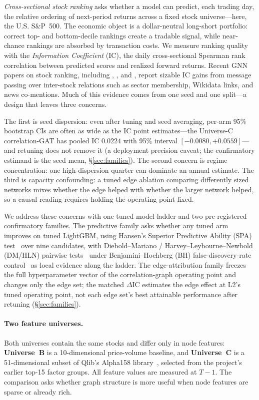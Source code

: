 \documentclass{article}
\begin{document}
\emph{Cross-sectional stock ranking} asks whether a model can predict, each trading day, the relative ordering of next-period returns across a fixed stock universe---here, the U.S. S\&P~500. The economic object is a dollar-neutral long-short portfolio: correct top- and bottom-decile rankings create a tradable signal, while near-chance rankings are absorbed by transaction costs. We measure ranking quality with the \emph{Information Coefficient} (IC), the daily cross-sectional Spearman rank correlation between predicted scores and realized forward returns. Recent GNN papers on stock ranking, including \citet{feng2019temporal}, \citet{kim2019hats}, and \citet{sawhney2021sthansr}, report sizable IC gains from message passing over inter-stock relations such as sector membership, Wikidata links, and news co-mentions. Much of this evidence comes from one seed and one split---a design that leaves three concerns.

The first is seed dispersion: even after tuning and seed averaging, per-arm 95\% bootstrap CIs are often as wide as the IC point estimates---the Universe-C correlation-GAT has pooled IC $0.0224$ with 95\% interval $[-0.0080,+0.0559]$---and retuning does not remove it (a deployment precision caveat; the confirmatory estimand is the seed mean, \S\ref{sec:families}). The second concern is regime concentration: one high-dispersion quarter can dominate an annual estimate. The third is capacity confounding: a tuned edge ablation comparing differently sized networks mixes whether the edge helped with whether the larger network helped, so a causal reading requires holding the operating point fixed.

We address these concerns with one tuned model ladder and two pre-registered confirmatory families. The predictive family asks whether any tuned arm improves on tuned LightGBM, using Hansen's Superior Predictive Ability (SPA) test~\citep{hansen2005spa} over nine candidates, with Diebold--Mariano / Harvey--Leybourne--Newbold (DM/HLN) pairwise tests~\citep{diebold1995comparing,harvey1997testing} under Benjamini--Hochberg (BH) false-discovery-rate control~\citep{benjamini1995controlling} as local evidence along the ladder. The edge-attribution family freezes the full hyperparameter vector of the correlation-graph operating point and changes only the edge set; the matched $\Delta$IC estimates the edge effect at L2's tuned operating point, not each edge set's best attainable performance after retuning (\S\ref{sec:families}).

\paragraph{Two feature universes.} Both universes contain the same stocks and differ only in node features: \textbf{Universe~B} is a 10-dimensional price-volume baseline, and \textbf{Universe~C} is a 51-dimensional subset of Qlib's Alpha158 library~\citep{yang2020qlib}, selected from the project's earlier top-15 factor groups. All feature values are measured at $T-1$. The comparison asks whether graph structure is more useful when node features are sparse or already rich.
\end{document}
